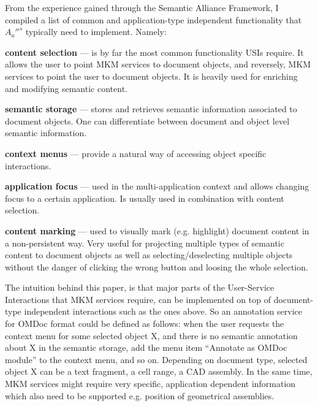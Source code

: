 \documentclass{llncs}
\begin{document}
From the experience gained through the Semantic Alliance Framework, I compiled a list of common and application-type independent functionality that $A_a''^s$ typically need to implement. Namely:
\begin{compactenum}
\item [\bf{content selection}] --- is by far the most common functionality USIs require. It allows the user to point MKM services to document objects, and reversely, MKM services to point the user to document objects. It is heavily used for enriching and modifying semantic content.
\item [\bf{semantic storage}] --- stores and retrieves semantic information associated to document objects. One can differentiate between document and object level semantic information.
\item [\bf{context menus}] --- provide a natural way of accessing object specific interactions. 
\item [\bf{application focus}] --- used in the multi-application context and allows changing focus to a certain application. Is usually used in combination with content selection.
\item [\bf{content marking}] --- used to visually mark (e.g. highlight) document content in a non-persistent way. Very useful for projecting multiple types of semantic content to document objects as well as selecting/deselecting multiple objects without the danger of clicking the wrong button and loosing the whole selection. 
\end{compactenum}
The intuition behind this paper, is that major parts of the User-Service Interactions that MKM services require, can be implemented on top of document-type independent interactions such as the ones above. So an annotation service for OMDoc format could be defined as follows: when the user requests the context menu for some selected object X, and there is no semantic annotation about X in the semantic storage, add the menu item ``Annotate as OMDoc module'' to the context menu, and so on. Depending on document type, selected object X can be a text fragment, a cell range, a CAD assembly. In the same time, MKM services might require very specific, application dependent information which also need to be supported e.g. position of geometrical assemblies. 
\end{document}
